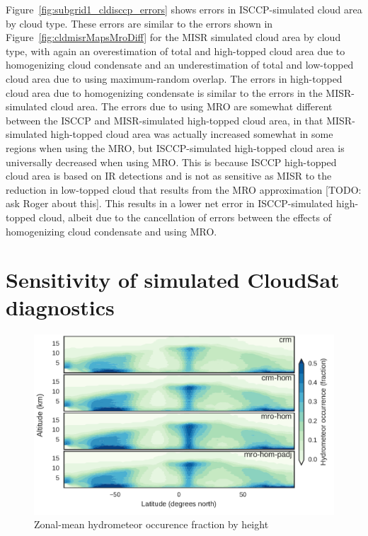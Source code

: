 Figure~\ref{fig:subgrid1_cldisccp_errors} shows errors in
ISCCP-simulated cloud area by cloud type. These errors are similar to
the errors shown in Figure~\ref{fig:cldmisrMapsMroDiff} for the MISR
simulated cloud area by cloud type, with again an overestimation of
total and high-topped cloud area due to homogenizing cloud condensate
and an underestimation of total and low-topped cloud area due to using
maximum-random overlap. The errors in high-topped cloud area due to
homogenizing condensate is similar to the errors in the MISR-simulated
cloud area. The errors due to using MRO are somewhat different between
the ISCCP and MISR-simulated high-topped cloud area, in that
MISR-simulated high-topped cloud area was actually increased somewhat in
some regions when using the MRO, but ISCCP-simulated high-topped cloud
area is universally decreased when using MRO. This is because ISCCP
high-topped cloud area is based on IR detections and is not as sensitive
as MISR to the reduction in low-topped cloud that results from the MRO
approximation {[}TODO: ask Roger about this{]}. This results in a lower
net error in ISCCP-simulated high-topped cloud, albeit due to the
cancellation of errors between the effects of homogenizing cloud
condensate and using MRO.

\section{Sensitivity of simulated CloudSat
diagnostics}\label{sensitivity-of-simulated-cloudsat-diagnostics}

\begin{figure}[htbp]
\centering
\includegraphics{graphics/subgrid1_hfba_zonal.pdf}
\caption{\label{fig:hfbaZonalMro}Zonal-mean hydrometeor occurence
fraction by height}\label{fig:hfbaZonalMro}
\end{figure}

